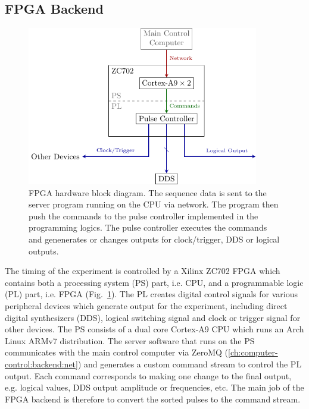 \subsection{FPGA Backend}
\begin{figure}
  \centering
  \includegraphics[width=0.9\textwidth]{figures/computer_control_backend_fpga.pdf}
  \caption[FPGA Block Diagram]{
    FPGA hardware block diagram.
    The sequence data is sent to the server program running on the CPU via network.
    The program then push the commands to the pulse controller implemented
    in the programming logics.
    The pulse controller executes the commands and genenerates or changes outputs
    for clock/trigger, DDS or logical outputs.
    \label{fig:computer-control:backend-fpga}}
\end{figure}
The timing of the experiment is controlled by a Xilinx ZC702 FPGA
which contains both a processing system (PS) part, i.e. CPU,
and a programmable logic (PL) part, i.e. FPGA (Fig.~\ref{fig:computer-control:backend-fpga}).
The PL creates digital control signals for various peripheral devices
which generate output for the experiment,
including direct digital synthesizers (DDS), logical switching signal
and clock or trigger signal for other devices.
The PS consists of a dual core Cortex-A9 CPU
which runs an Arch Linux ARMv7 distribution.
The server software that runs on the PS communicates with the main control computer
via ZeroMQ (\ref{ch:computer-control:backend:net})
and generates a custom command stream to control the PL output.
Each command corresponds to making one change to the final output, e.g.
logical values, DDS output amplitude or frequencies, etc.
The main job of the FPGA backend is therefore to convert
the sorted pulses to the command stream.


